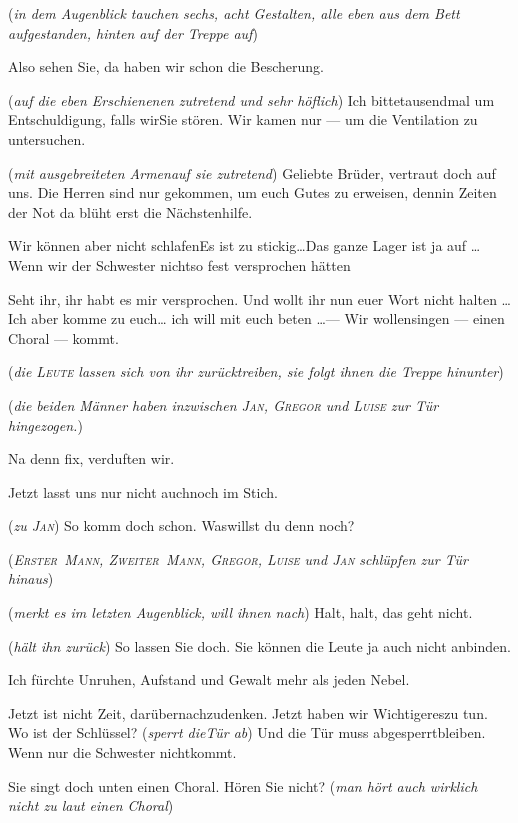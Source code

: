\documentclass[
	final,
	a4paper,
	ngerman,
	mpinclude = true, %
	twoside = true,
	open = right,
	cleardoublepage = plain,
	DIV = 13,
	BCOR = 1cm,
	titlepage = firstiscover,
	]{scrbook}
\newcommand{\direction}[1]{(\textit{#1})}
\newcommand{\thecharacter}[1]{\textup{\textsc{#1}}\xspace}
\newcommand{\theGregor}{\thecharacter{Gregor}}
\newcommand{\theJan}{\thecharacter{Jan}}
\newcommand{\theLuise}{\thecharacter{Luise}}
\newcommand{\theAlexis}{\thecharacter{Alexis}}
\newcommand{\theErsterMann}{\thecharacter{Erster~Mann}}
\newcommand{\theZweiterMann}{\thecharacter{Zweiter~Mann}}
\newcommand{\theLeute}{\thecharacter{Leute}}
\newcommand{\character}[1]{\item[#1]}
\newcommand{\Gregor}{\character{\theGregor}}
\newcommand{\Generaldirektor}{\character{Direktor}}
\newcommand{\Alexis}{\character{\theAlexis}}
\newcommand{\Heilsarmeeschwester}{\character{Schwester}}
\newcommand{\ErsterMann}{\character{1. Mann}}
\newcommand{\ZweiterMann}{\character{2. Mann}}
\newcommand{\Leute}{\character{\theLeute}}
\begin{document}
\begin{play}
\direction{in dem Augenblick tauchen sechs, acht Gestalten, alle eben aus dem Bett aufgestanden, hinten auf der Treppe auf}

Also sehen Sie, da haben wir schon die Bescherung.

\Generaldirektor
\direction{auf die eben Erschienenen zutretend und sehr höflich} Ich bittetausendmal um Entschuldigung, falls wirSie stören. Wir kamen nur --- um die Ventilation zu untersuchen.

\Heilsarmeeschwester
\direction{mit ausgebreiteten Armenauf sie zutretend} Geliebte Brüder, vertraut doch auf uns. Die Herren sind nur gekommen, um euch Gutes zu erweisen, dennin Zeiten der Not da blüht erst die Nächstenhilfe.

\Leute
Wir können aber nicht schlafenEs ist zu stickig\ldots Das ganze Lager ist ja auf \ldots Wenn wir der Schwester nichtso fest versprochen hätten

\Heilsarmeeschwester
Seht ihr, ihr habt es mir versprochen. Und wollt ihr nun euer Wort nicht halten \ldots Ich aber komme zu euch\ldots{} ich will mit euch beten \ldots --- Wir wollensingen --- einen Choral --- kommt.

\direction{die \theLeute lassen sich von ihr zurücktreiben, sie folgt ihnen die Treppe hinunter}

\direction{die beiden Männer haben inzwischen \theJan, \theGregor und \theLuise zur Tür hingezogen.}

\ErsterMann
Na denn fix, verduften wir.

\ZweiterMann
Jetzt lasst uns nur nicht auchnoch im Stich.

\Gregor
\direction{zu \theJan} So komm doch schon. Waswillst du denn noch?

\direction{\theErsterMann, \theZweiterMann, \theGregor, \theLuise und \theJan schlüpfen zur Tür hinaus}

\Alexis
\direction{merkt es im letzten Augenblick, will ihnen nach} Halt, halt, das geht nicht.

\Generaldirektor
\direction{hält ihn zurück} So lassen Sie doch. Sie können die Leute ja auch nicht anbinden.

\Alexis
Ich fürchte Unruhen, Aufstand und Gewalt mehr als jeden Nebel.

\Generaldirektor
Jetzt ist nicht Zeit, darübernachzudenken. Jetzt haben wir Wichtigereszu tun. Wo ist der Schlüssel? \direction{sperrt dieTür ab} Und die Tür muss abgesperrtbleiben. Wenn nur die Schwester nichtkommt.

\Alexis
Sie singt doch unten einen Choral. Hören Sie nicht? \direction{man hört auch wirklich nicht zu laut einen Choral}


\end{play}
\end{document}
